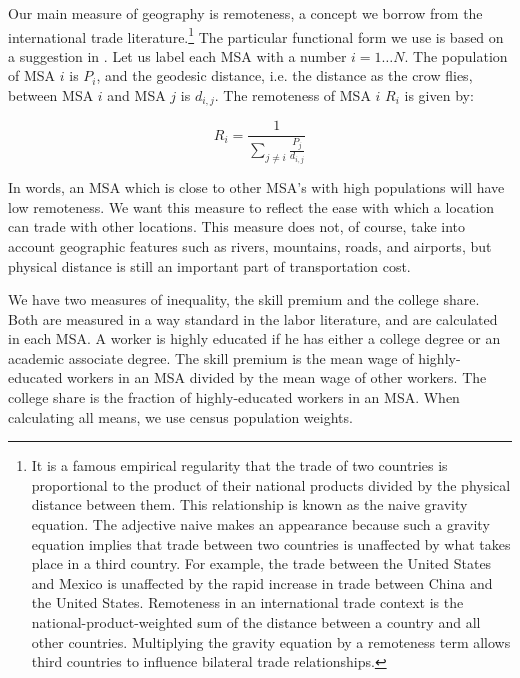 \documentclass{article}
\begin{document}
Our main measure of geography is remoteness, a concept we borrow from the international trade literature.\footnote{It is a famous empirical regularity that the trade of two countries is proportional to the product of their national products divided by the physical distance between them.  This relationship is known as the naive gravity equation.  The adjective naive makes an appearance because such a gravity equation implies that trade between two countries is unaffected by what takes place in a third country.  For example, the trade between the United States and Mexico is unaffected by the rapid increase in trade between China and the United States.  Remoteness in an international trade context is the national-product-weighted sum of the distance between a country and all other countries.  Multiplying the gravity equation by a remoteness term allows third countries to influence bilateral trade relationships.}  The particular functional form we use is based on a suggestion in \citet{head2003gravity}.  Let us label each MSA with a number $i=1\dots N$.  The population of MSA $i$ is $P_i$, and the geodesic distance, i.e. the distance as the crow flies, between MSA $i$ and MSA $j$ is $d_{i,j}$.  The remoteness of MSA $i$ $R_i$ is given by:

\begin{equation}
    R_i = \frac{1}{\sum_{j\neq i} \frac{P_j}{d_{i,j}}} \nonumber
    \label{eq:rem}
\end{equation}

In words, an MSA which is close to other MSA's with high populations will have low remoteness.  We want this measure to reflect the ease with which a location can trade with other locations.  This measure does not, of course, take into account geographic features such as rivers, mountains, roads, and airports, but physical distance is still an important part of transportation cost.  

We have two measures of inequality, the skill premium and the college share.  Both are measured in a way standard in the labor literature, and are calculated in each MSA.  A worker is highly educated if he has either a college degree or an academic associate degree.  The skill premium is the mean wage of highly-educated workers in an MSA divided by the mean wage of other workers.  The college share is the fraction of highly-educated workers in an MSA.  When calculating all means, we use census population weights.
\end{document}
